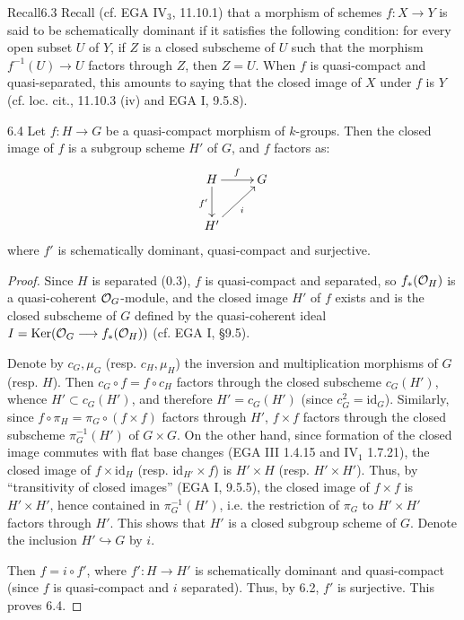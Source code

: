 \begin{enoncerm}{Recall}{6.3}\label{VIA.6.3}
Recall (cf. EGA IV$_3$, 11.10.1) that a morphism of schemes $f:X\to Y$ is said to be schematically dominant if it satisfies the following condition: for every open subset $U$ of $Y$, if $Z$ is a closed subscheme of $U$ such that the morphism $f^{-1}(U)\to U$ factors through $Z$, then $Z=U$. When $f$ is quasi-compact and quasi-separated, this amounts to saying that the closed image of $X$ under $f$ is $Y$ (cf. loc. cit., 11.10.3 (iv) and EGA I, 9.5.8).
\end{enoncerm}
\begin{proposition}{6.4}\label{VIA.6.4}
Let $f:H\to G$ be a quasi-compact morphism of $k$-groups. Then the closed image of $f$ is a subgroup scheme $H'$ of $G$, and $f$ factors as:
\[
\xymatrix{H\ar[r]^f\ar[d]_{f'}&G\\H'\ar[ur]_i&}
\]
where $f'$ is schematically dominant, quasi-compact and surjective.
\end{proposition}
\begin{proof}
Since $H$ is separated (0.3), $f$ is quasi-compact and separated, so $f_*(\mathcal{O}_H)$ is a quasi-coherent $\mathcal{O}_G$-module, and the closed image $H'$ of $f$ exists and is the closed subscheme of $G$ defined by the quasi-coherent ideal $I=\operatorname{Ker}(\mathcal{O}_G\longrightarrow f_*(\mathcal{O}_H))$ (cf. EGA I, §9.5).

Denote by $c_G,\mu_G$ (resp. $c_H,\mu_H$) the inversion and multiplication morphisms of $G$ (resp. $H$). Then $c_G\circ f=f\circ c_H$ factors through the closed subscheme $c_G(H')$, whence $H'\subset c_G(H')$, and therefore $H'=c_G(H')$ (since $c_G^2=\mathrm{id}_G$). Similarly, since $f\circ\pi_H=\pi_G\circ(f\times f)$ factors through $H'$, $f\times f$ factors through the closed subscheme $\pi_G^{-1}(H')$ of $G\times G$. On the other hand, since formation of the closed image commutes with flat base changes (EGA III 1.4.15 and IV$_1$ 1.7.21), the closed image of $f\times\mathrm{id}_H$ (resp. $\mathrm{id}_{H'}\times f$) is $H'\times H$ (resp. $H'\times H'$). Thus, by ``transitivity of closed images'' (EGA I, 9.5.5), the closed image of $f\times f$ is $H'\times H'$, hence contained in $\pi_G^{-1}(H')$, i.e. the restriction of $\pi_G$ to $H'\times H'$ factors through $H'$. This shows that $H'$ is a closed subgroup scheme of $G$. Denote the inclusion $H'\hookrightarrow G$ by $i$.

Then $f=i\circ f'$, where $f':H\to H'$ is schematically dominant and quasi-compact (since $f$ is quasi-compact and $i$ separated). Thus, by 6.2, $f'$ is surjective. This proves 6.4.
\end{proof}
